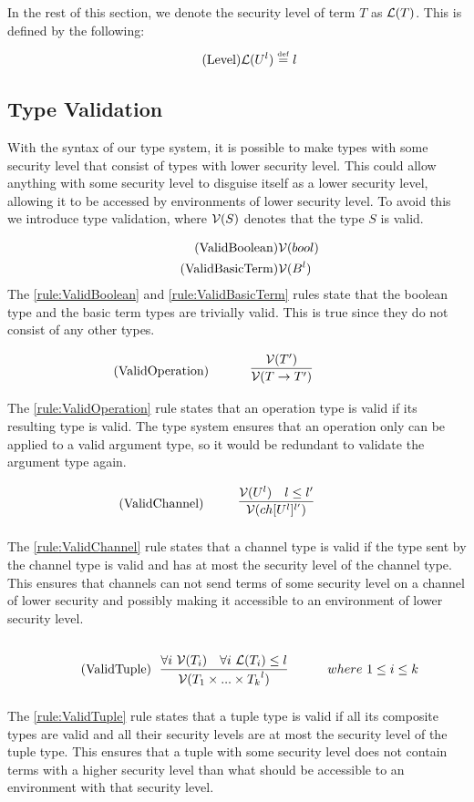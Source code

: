 In the rest of this section, we denote the security level of term $T$ as $\mathcal{L}(T)$.
This is defined by the following:
\begin{align*}
\tag{Level}\mathcal{L}(U^l)\overset{\underset{\mathrm{def}}{}}{=} l
\end{align*}

\subsection{Type Validation}
With the syntax of our type system, it is possible to make types with some security level that consist of types with lower security level.
This could allow anything with some security level to disguise itself as a lower security level, allowing it to be accessed by environments of lower security level.
To avoid this we introduce type validation, where $\mathcal{V}(S)$ denotes that the type $S$ is valid.

\begin{align*}
\tag{ValidBoolean}\label{rule:ValidBoolean} &\mathcal{V}(bool)\\
\tag{ValidBasicTerm}\label{rule:ValidBasicTerm} &\mathcal{V}(B^l)
\end{align*}
The \ref{rule:ValidBoolean} and \ref{rule:ValidBasicTerm} rules state that the boolean type and the basic term types are trivially valid.
This is true since they do not consist of any other types.

\begin{align*}
\tag{ValidOperation}\label{rule:ValidOperation} &\infrule{\valid{T'}}{\valid{T\ra T'}}
\end{align*}
The \ref{rule:ValidOperation} rule states that an operation type is valid if its resulting type is valid.
The type system ensures that an operation only can be applied to a valid argument type, so it would be redundant to validate the argument type again.

\begin{align*}
\tag{ValidChannel}\label{rule:ValidChannel} &\infrule{\valid{U^l}\quad l\leq l'}{\valid{ch[U^l]^{l'}}}
\end{align*}

The \ref{rule:ValidChannel} rule states that a channel type is valid if the type sent by the channel type is valid and has at most the security level of the channel type.
This ensures that channels can not send terms of some security level on a channel of lower security and possibly making it accessible to an environment of lower security level.

\begin{align*}
\tag{ValidTuple}\label{rule:ValidTuple} &\infrule{\forall i\ \valid{T_i}\quad \forall i\ \level{T_i}\leq l}{\valid{{T_1 \times...\times T_k}^l}}& where\ 1\leq i\leq k
\end{align*}
The \ref{rule:ValidTuple} rule states that a tuple type is valid if all its composite types are valid and all their security levels are at most the security level of the tuple type.
This ensures that a tuple with some security level does not contain terms with a higher security level than what should be accessible to an environment with that security level.

